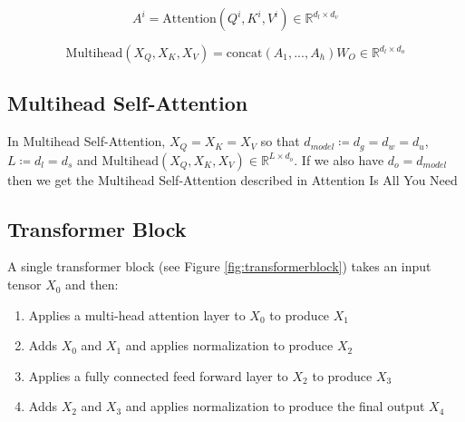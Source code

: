 \documentclass[11pt]{article}
\theoremstyle{definition}
\begin{document}
\begin{equation}
A^i = \mathrm{Attention} \left(Q^i,K^i,V^i \right) \in \mathbb{R}^{d_l \times d_v}
\end{equation}

\begin{equation}
\mathrm{Multihead}\left(X_Q, X_K, X_V \right) =
\mathrm{concat} \left( A_1, ... , A_h \right)W_O
\in \mathbb{R}^{d_l \times d_o}
\end{equation}

\subsection{Multihead Self-Attention}

In Multihead Self-Attention, $X_Q = X_K = X_V$ so that $d_{model} \coloneqq d_g = d_w = d_u$, $L \coloneqq d_l = d_s$ and $\mathrm{Multihead}\left(X_Q, X_K, X_V \right) \in \mathbb{R}^{L \times d_o}$. If we also have $d_o = d_{model}$ then we get the Multihead Self-Attention described in \cite{vaswani2017attention}{Attention Is All You Need}

\subsection{Transformer Block}

A single transformer block (see Figure \ref{fig:transformerblock}) takes an input tensor $X_0$ and then:
\begin{enumerate}
\item Applies a multi-head attention layer to $X_0$ to produce $X_1$
\item Adds $X_0$ and $X_1$ and applies normalization to produce $X_2$
\item Applies a fully connected feed forward layer to $X_2$ to produce $X_3$
\item Adds $X_2$ and $X_3$ and applies normalization to produce the final output $X_4$
\end{enumerate}
\end{document}
